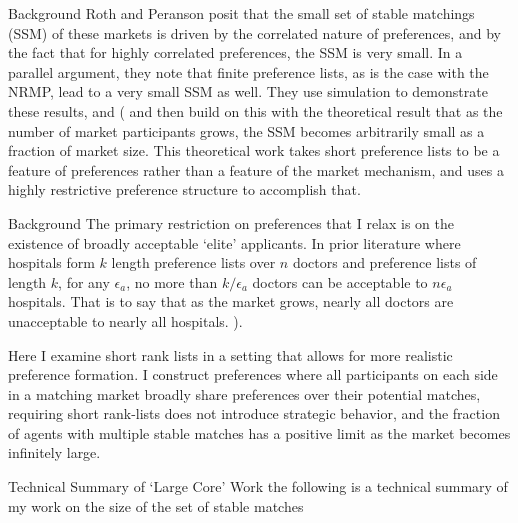 \documentclass{beamer}
\begin{document}
\begin{frame}{Background}
    Roth and Peranson posit that the small set of stable matchings (SSM) of these markets is driven by the correlated nature of preferences, and by the fact that for highly correlated preferences, the SSM is very small.  In a parallel argument, they note that finite preference lists, as is the case with the NRMP, lead to a very small SSM as well.  They use simulation to demonstrate these results, and (\cite{Immorlica2005} and then \cite{Kojima2009} build on this with the theoretical result that as the number of market participants grows, the SSM becomes arbitrarily small as a fraction of market size. This theoretical work takes short preference lists to be a feature of preferences rather than a feature of the market mechanism, and uses a highly restrictive preference structure to accomplish that. 
\end{frame}


\begin{frame}{Background}
    The primary restriction on preferences that  I relax is on the existence of broadly acceptable `elite' applicants. In prior literature where hospitals form $k$ length preference lists over $n$ doctors and preference lists of length $k$,  for any $\epsilon_a$, no more than $k/\epsilon_a$ doctors can be acceptable to $n\epsilon_a$ hospitals. That is to say that as the market grows, nearly all doctors are unacceptable to nearly all hospitals. ).  

    Here I examine short rank lists in a setting that allows for more realistic preference formation. I construct preferences where all participants on each side in a matching market broadly share preferences over their potential matches, requiring short rank-lists does not introduce strategic behavior, and the fraction of agents with multiple stable matches has a positive limit as the market becomes infinitely large.
\end{frame}


\begin{frame}{Technical Summary of `Large Core' Work}
	the following is a technical summary of my work on the size of the set of stable matches
\end{frame}
\end{document}
